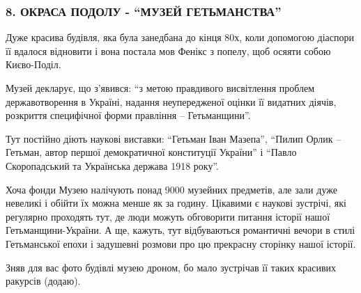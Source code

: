  
 
 
 
 
\subsubsection{8. ОКРАСА ПОДОЛУ - \enquote{МУЗЕЙ ГЕТЬМАНСТВА}}

Дуже красива будівля, яка була занедбана до кінця 80х, коли допомогою діаспори
її вдалося відновити і вона постала мов Фенікс з попелу, щоб осяяти собою
Києво-Поділ.


Музей декларує, що з’явився: \enquote{з метою правдивого висвітлення проблем
державотворення в Україні, надання неупередженої оцінки її видатних діячів,
розкриття специфічної форми правління – Гетьманщини}.


Тут постійно діють наукові виставки: \enquote{Гетьман Іван Мазепа},
\enquote{Пилип Орлик – Гетьман, автор першої демократичної конституції України}
і \enquote{Павло Скоропадський та Українська держава 1918 року}. 


Хоча фонди Музею налічують понад 9000 музейних предметів, але зали дуже
невеликі і обійти їх можна менше як за годину. Цікавими є наукові зустрічі, які
регулярно проходять тут, де люди можуть обговорити питання історії нашої
Гетьманщини-України. А ще, кажуть, тут відбуваються романтичні вечори в стилі
Гетьманської епохи і задушевні розмови про цю прекрасну сторінку нашої історії.


Зняв для вас фото будівлі музею дроном, бо мало зустрічав її таких красивих
ракурсів (додаю). 


